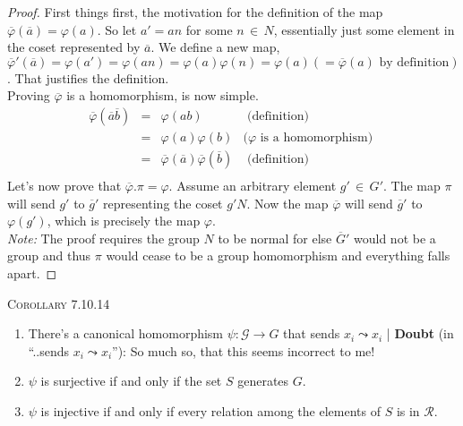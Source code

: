 \documentclass[12pt]{article}
\begin{document}
\begin{proof}
First things first, the motivation for the definition of the map $\overline \varphi (\overline a) = \varphi (a)$. So let $a'=an$ for some $n\, \in \, N$, essentially just some element in the coset represented by $\overline a$. We define a new map, $\overline \varphi' (\overline a) = \varphi (a') = \varphi (an) = \varphi(a) \varphi (n) = \varphi (a) (= \overline \varphi (a) \text{ by definition})$. That justifies the definition.\\
Proving $\overline \varphi$ is a homomorphism, is now simple. 
\begin{equation*}
\begin{array}{lclr}
\overline \varphi (\overline a \overline b) & = &  \varphi(ab) & \text{ (definition) }\\
 & = &  \varphi(a) \varphi (b) &  (\varphi \text{ is a homomorphism) }\\
 & = &  \overline \varphi( \overline a) \overline \varphi ( \overline b) & \text{ (definition) }\\
\end{array}
\end{equation*}
Let's now prove that $\overline \varphi . \pi = \varphi$. Assume an arbitrary element $g' \, \in \, G'$. The map $\pi$ will send $g'$ to $\overline g'$ representing the coset $g'N$. Now the map $\overline \varphi$ will send $\overline g'$ to $\varphi (g')$, which is precisely the map $\varphi$.\\
\emph {Note:} The proof requires the group $N$ to be normal for else $\overline G'$ would not be a group and thus $\pi$ would cease to be a group homomorphism and everything falls apart.
\end{proof}
\textsc {Corollary 7.10.14}
\begin{enumerate}[(1)]
\item There's a canonical homomorphism $\psi: \mathcal G \rightarrow G$ that sends $x_{i} \leadsto x_{i}$ | \textbf {Doubt} (in ``..sends $x_{i} \leadsto x_{i}$''): So much so, that this seems incorrect to me!
\item $\psi$ is surjective if and only if the set $S$ generates $G$.
\item $\psi$ is injective if and only if every relation among the elements of $S$ is in $\mathcal R$.
\end{enumerate}
\end{document}
